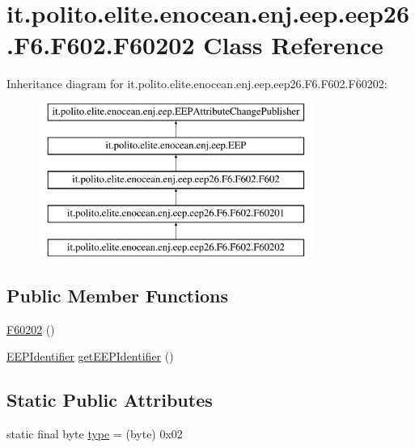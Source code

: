 \hypertarget{classit_1_1polito_1_1elite_1_1enocean_1_1enj_1_1eep_1_1eep26_1_1_f6_1_1_f602_1_1_f60202}{}\section{it.\+polito.\+elite.\+enocean.\+enj.\+eep.\+eep26.\+F6.\+F602.\+F60202 Class Reference}
\label{classit_1_1polito_1_1elite_1_1enocean_1_1enj_1_1eep_1_1eep26_1_1_f6_1_1_f602_1_1_f60202}
Inheritance diagram for it.\+polito.\+elite.\+enocean.\+enj.\+eep.\+eep26.\+F6.\+F602.\+F60202\+:\begin{figure}[H]
\begin{center}
\leavevmode
\includegraphics[height=5.000000cm]{classit_1_1polito_1_1elite_1_1enocean_1_1enj_1_1eep_1_1eep26_1_1_f6_1_1_f602_1_1_f60202}
\end{center}
\end{figure}
\subsection*{Public Member Functions}
\begin{DoxyCompactItemize}
\item 
\hyperlink{classit_1_1polito_1_1elite_1_1enocean_1_1enj_1_1eep_1_1eep26_1_1_f6_1_1_f602_1_1_f60202_aecb9c9075a614503da99a6028dcc6f34}{F60202} ()
\item 
\hyperlink{classit_1_1polito_1_1elite_1_1enocean_1_1enj_1_1eep_1_1_e_e_p_identifier}{E\+E\+P\+Identifier} \hyperlink{classit_1_1polito_1_1elite_1_1enocean_1_1enj_1_1eep_1_1eep26_1_1_f6_1_1_f602_1_1_f60202_af4037d625c68e575343f5e4f02025a87}{get\+E\+E\+P\+Identifier} ()
\end{DoxyCompactItemize}
\subsection*{Static Public Attributes}
\begin{DoxyCompactItemize}
\item 
static final byte \hyperlink{classit_1_1polito_1_1elite_1_1enocean_1_1enj_1_1eep_1_1eep26_1_1_f6_1_1_f602_1_1_f60202_a803fe49f60d7c544a4a8766fbbb1ab49}{type} = (byte) 0x02
\end{DoxyCompactItemize}
